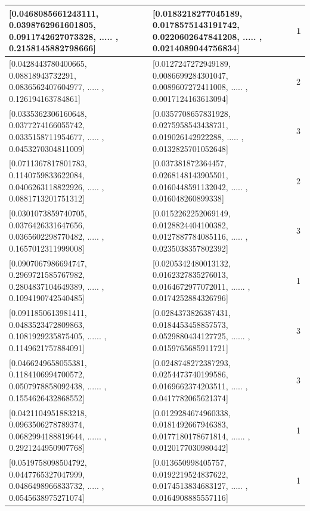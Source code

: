 \begin{table}[]
{\begin{tabular}{@{}|l|l|l|@{}}
      {[}0.0468085661243111, 0.0398762961601805, 0.0911742627073328, ..... , 0.2158145882798666{]}  & {[}0.0183218277045189, 0.0178575143191742, 0.0220602647841208, ..... , 0.0214089044756834{]}  & 1              \\ \midrule
      {[}0.0428443780400665, 0.08818943732291, 0.0836562407604977, ..... , 0.126194163784861{]}     & {[}0.0127247272949189, 0.0086699284301047, 0.0089607272411008, ..... , 0.0017124163613094{]}  & 2              \\ \midrule
      {[}0.0335362306160648, 0.0377274166055742, 0.0335158711954677, ..... , 0.0453270304811009{]}  & {[}0.0357708657831928, 0.0275958543438731, 0.019026142922288, ..... , 0.0132825701052648{]}   & 3              \\ \midrule
      {[}0.0711367817801783, 0.1140759833622084, 0.0406263118822926, ..... , 0.0881713201751312{]}  & {[}0.037381872364457, 0.0268148143905501, 0.0160448591132042, ..... , 0.016048260899338{]}    & 2              \\ \midrule
      {[}0.0301073859740705, 0.0376426331647656, 0.0365602298770482, ..... , 0.1657012311999008{]}  & {[}0.0152262252069149, 0.0128824404100382, 0.0127887784085116, ..... , 0.0235038357802392{]}  & 3              \\ \midrule
      {[}0.0907067986694747, 0.2969721585767982, 0.2804837104649389, ..... , 0.1094190742540485{]}  & {[}0.0205342480013132, 0.0162327835276013, 0.0164672977072011, ...... , 0.0174252884326796{]} & 1              \\ \midrule
      {[}0.0911850613981411, 0.0483523472809863, 0.1081929235875405, ...... , 0.1149621757884091{]} & {[}0.0284373826387431, 0.0184453458857573, 0.0529880434127725, ...... , 0.0159765685911721{]} & 3              \\ \midrule
      {[}0.0466249658055381, 0.1184106994700572, 0.0507978858092438, ...... , 0.1554626432868552{]} & {[}0.0248748272387293, 0.0254473740199586, 0.0169662374203511, ..... , 0.0417782065621374{]}  & 3              \\ \midrule
      {[}0.0421104951883218, 0.0963506278789374, 0.0682994188819644, ...... , 0.2921244950907768{]} & {[}0.0129284674960338, 0.0181492667946383, 0.0177180178671814, ...... , 0.0120177030980442{]} & 1              \\ \midrule
      {[}0.0519758098504792, 0.0447765327047999, 0.0486498966833732, ..... , 0.0545638975271074{]}  & {[}0.013650998405757, 0.0192219524837622, 0.0174513834683127, ..... , 0.0164908885557116{]}   & 1              \\ \midrule

\end{tabular}}
\end{table}
